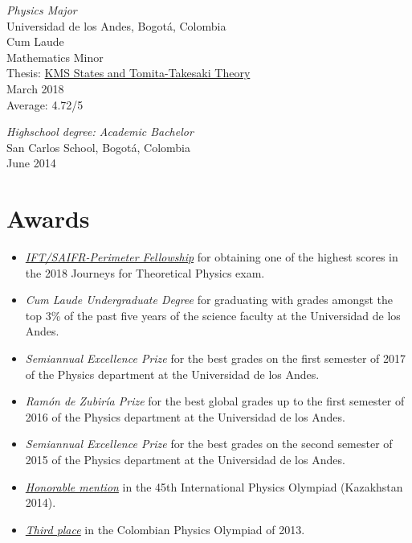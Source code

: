 \documentclass[line,margin]{res}
\begin{document}
\begin{resume}
{\sl Physics Major\\}
Universidad de los Andes, Bogotá, Colombia \\
Cum Laude \\
Mathematics Minor \\
Thesis: \href{https://github.com/ivanmbur/Monografia/blob/master/monografia.pdf}{KMS States and Tomita-Takesaki Theory} \\
March 2018 \\
Average: 4.72/5

{\sl Highschool degree: Academic Bachelor} \\
San Carlos School, Bogotá, Colombia \\
June 2014

\section{Awards}

\begin{itemize}

\item \href{http://journeys.ictp-saifr.org/journeys-2018/}{\sl IFT/SAIFR-Perimeter Fellowship} for obtaining one of the highest scores in the 2018 Journeys for Theoretical Physics exam.

\item {\sl Cum Laude Undergraduate Degree} for graduating with grades amongst the top 3\% of the past five years of the science faculty at the Universidad de los Andes.  

\item {\sl Semiannual Excellence Prize} for the best grades on the first semester of 2017 of the Physics department at the Universidad de los Andes.

\item {\sl Ramón de Zubiría Prize} for the best global grades up to the first semester of 2016 of the Physics department at the Universidad de los Andes.

\item {\sl Semiannual Excellence Prize} for the best grades on the second semester of 2015 of the Physics department at the Universidad de los Andes.

\item \href{http://ipho2014.kz/blogs/view/1/42}{\sl Honorable mention} in the 45th International Physics Olympiad (Kazakhstan 2014).

\item \href{http://oc.uan.edu.co/component/k2/item/39-xxix-olimpiada-colombiana-de-fisica-2013}{\sl Third place} in the Colombian Physics Olympiad of 2013.


\end{itemize}
\end{resume}
\end{document}
